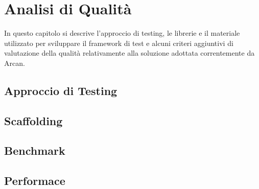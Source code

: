 \chapter{Analisi di Qualit\`a}

In questo capitolo si descrive l'approccio di testing, le librerie e il materiale utilizzato per sviluppare il framework di test e alcuni criteri aggiuntivi di valutazione della qualit\`a relativamente alla soluzione adottata correntemente da Arcan.

\section{Approccio di Testing}

\section{Scaffolding}

\section{Benchmark}

\section{Performace}
